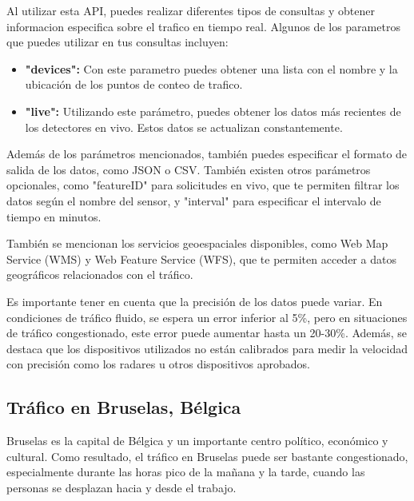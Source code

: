 \documentclass[12pt]{article}
\begin{document}
Al utilizar esta API, puedes realizar diferentes tipos de consultas y obtener informacion especifica sobre el trafico en tiempo real. Algunos de los parametros que puedes utilizar en tus consultas incluyen:


\begin{itemize}
    \item {
       
        \textbf{"devices":} Con este parametro puedes obtener una lista con el nombre y la ubicación de los puntos de conteo de trafico.
    
    }
    \item {
    
        \textbf{"live":} Utilizando este parámetro, puedes obtener los datos más recientes de los detectores en vivo. Estos datos se actualizan constantemente.
    }
        
\end{itemize}

Además de los parámetros mencionados, también puedes especificar el formato de salida de los datos, como JSON o CSV. También existen otros parámetros opcionales, como "featureID" para solicitudes en vivo, que te permiten filtrar los datos según el nombre del sensor, y "interval" para especificar el intervalo de tiempo en minutos.

También se mencionan los servicios geoespaciales disponibles, como Web Map Service (WMS) y Web Feature Service (WFS), que te permiten acceder a datos geográficos relacionados con el tráfico.

Es importante tener en cuenta que la precisión de los datos puede variar. En condiciones de tráfico fluido, se espera un error inferior al 5\%, pero en situaciones de tráfico congestionado, este error puede aumentar hasta un 20-30\%. Además, se destaca que los dispositivos utilizados no están calibrados para medir la velocidad con precisión como los radares u otros dispositivos aprobados.

\subsection{Tráfico en Bruselas, Bélgica}

Bruselas es la capital de Bélgica y un importante centro político, económico y cultural. Como resultado, el tráfico en Bruselas puede ser bastante congestionado, especialmente durante las horas pico de la mañana y la tarde, cuando las personas se desplazan hacia y desde el trabajo. \citep{ref57}
\end{document}
